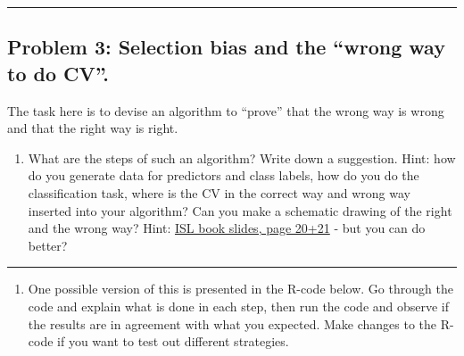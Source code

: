 \documentclass[]{article}
\providecommand{\tightlist}{%
  \setlength{\itemsep}{0pt}\setlength{\parskip}{0pt}}
\begin{document}
\begin{center}\rule{0.5\linewidth}{\linethickness}\end{center}

\subsection{\texorpdfstring{Problem 3: Selection bias and the ``wrong
way to do
CV''.}{Problem 3: Selection bias and the wrong way to do CV.}}\label{problem-3-selection-bias-and-the-wrong-way-to-do-cv.}

The task here is to devise an algorithm to ``prove'' that the wrong way
is wrong and that the right way is right.

\begin{enumerate}
\def\labelenumi{\alph{enumi}.}
\tightlist
\item
  What are the steps of such an algorithm? Write down a suggestion.
  Hint: how do you generate data for predictors and class labels, how do
  you do the classification task, where is the CV in the correct way and
  wrong way inserted into your algorithm? Can you make a schematic
  drawing of the right and the wrong way? Hint:
  \href{https://lagunita.stanford.edu/c4x/HumanitiesScience/StatLearning/asset/cv_boot.pdf}{ISL
  book slides, page 20+21} - but you can do better?
\end{enumerate}

\begin{center}\rule{0.5\linewidth}{\linethickness}\end{center}

\begin{enumerate}
\def\labelenumi{\alph{enumi}.}
\setcounter{enumi}{1}
\tightlist
\item
  One possible version of this is presented in the R-code below. Go
  through the code and explain what is done in each step, then run the
  code and observe if the results are in agreement with what you
  expected. Make changes to the R-code if you want to test out different
  strategies.
\end{enumerate}
\end{document}
